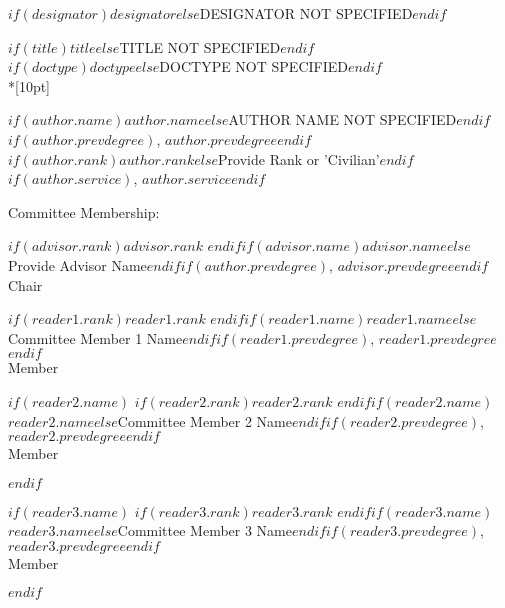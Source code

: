 \documentclass[12pt,letterpaper,toc=flat,oneside]{report}
\begin{document}
	\thispagestyle{empty}
	\setcounter{page}{3}
	\noindent $if(designator)$$designator$$else$DESIGNATOR NOT SPECIFIED$endif$
	\vfill
	\begin{center}
	    \MakeUppercase{$if(title)$$title$$else$TITLE NOT SPECIFIED$endif$}\\[10pt]
	    \MakeUppercase{$if(doctype)$$doctype$$else$DOCTYPE NOT SPECIFIED$endif$}\\*[10pt]
	    
	    \begingroup
  \singlespace
    $if(author.name)$$author.name$$else$AUTHOR NAME NOT SPECIFIED$endif$$if(author.prevdegree)$, $author.prevdegree$$endif$\\ 
    $if(author.rank)$$author.rank$$else$Provide Rank or 'Civilian'$endif$$if(author.service)$, \MakeUppercase{$author.service$}$endif$
    \par
  \endgroup
  
	\bigskip\medskip
	Committee Membership:
	\bigskip\medskip
	
	\begingroup
  \singlespace
    $if(advisor.rank)$$advisor.rank$ $endif$$if(advisor.name)$$advisor.name$$else$Provide Advisor Name$endif$$if(author.prevdegree)$, $advisor.prevdegree$$endif$\\ 
    Chair
    \par
  \endgroup
  \bigskip\bigskip
  
  \begingroup
  \singlespace
    $if(reader1.rank)$$reader1.rank$ $endif$$if(reader1.name)$$reader1.name$$else$Committee Member 1 Name$endif$$if(reader1.prevdegree)$, $reader1.prevdegree$$endif$\\ 
    Member
    \par
  \endgroup
  \bigskip\bigskip
  
  $if(reader2.name)$
  \begingroup
  \singlespace
    $if(reader2.rank)$$reader2.rank$ $endif$$if(reader2.name)$$reader2.name$$else$Committee Member 2 Name$endif$$if(reader2.prevdegree)$, $reader2.prevdegree$$endif$\\ 
    Member
    \par
  \endgroup
  \bigskip\bigskip
  $endif$
  
  $if(reader3.name)$
  \begingroup
  \singlespace
    $if(reader3.rank)$$reader3.rank$ $endif$$if(reader3.name)$$reader3.name$$else$Committee Member 3 Name$endif$$if(reader3.prevdegree)$, $reader3.prevdegree$$endif$\\ 
    Member
    \par
  \endgroup
  \bigskip\bigskip
  $endif$
  

\end{center}
\end{document}
